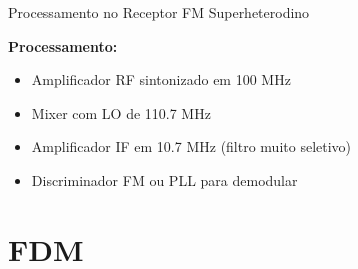 
\begin{frame}{Processamento no Receptor FM Superheterodino}

\textbf{Processamento:}
\begin{itemize}
\item Amplificador RF sintonizado em 100 MHz
\item Mixer com LO de 110.7 MHz
\item Amplificador IF em 10.7 MHz (filtro muito seletivo)
\item Discriminador FM ou PLL para demodular
\end{itemize}

\end{frame}


\section{FDM}

